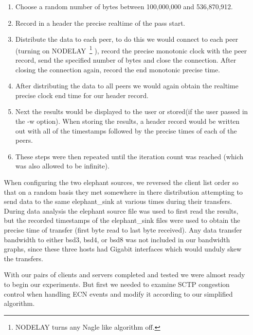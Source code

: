 \documentclass[12pt]{article}
\begin{document}
\begin{enumerate}

\item Choose a random number of bytes between 100,000,000 and 536,870,912.

\item Record in a header the precise realtime of the pass start.

\item Distribute the data to each peer, to do this we would connect to each peer (turning on 
NODELAY~\footnote{NODELAY turns any Nagle\cite{rfc896} like algorithm off.} ), record the
precise monotonic clock with the peer record, send the specified number of bytes
and close the connection. After closing the connection again, record the end monotonic 
precise time.

\item After distributing the data to all peers we would again obtain the realtime precise
clock end time for our header record.


\item Next the results would be displayed to the user or stored(if the user passed in the -w option). When storing the
results, a header record would be written out with all of the timestamps followed
by the precise times of each of the peers.

\item These steps were then repeated until the iteration count was reached (which was
also allowed to be infinite).

\end{enumerate}

When configuring the two elephant sources, we reversed the client list order so that on a random
basis they met somewhere in there distribution attempting to send data to the same elephant\_sink at various
times during their transfers. During data analysis the elephant source file was used to first read the results, but the 
recorded timestamps of the elephant\_sink files were used to obtain the precise time of transfer (first byte
read to last byte received). Any data transfer bandwidth to either bsd3, bsd4, or bsd8 was not included in
our bandwidth graphs, since these three hosts had Gigabit interfaces which would unduly skew the
transfers.

With our pairs of clients and servers completed and tested we were almost ready to 
begin our experiments. But first we needed to examine SCTP congestion control
when handling ECN events and modify it according to our simplified algorithm.
\end{document}
